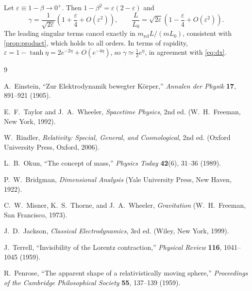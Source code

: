 \documentclass[11pt,a4paper]{article}
\theoremstyle{definition}
\theoremstyle{remark}
\newcommand{\mrel}{m_{\mathrm{rel}}}
\begin{document}
Let $\varepsilon\equiv1-\beta\to0^+$. Then $1-\beta^2=\varepsilon(2-\varepsilon)$ and
\begin{equation}
  \gamma=\frac{1}{\sqrt{2\varepsilon}}\left(1+\frac{\varepsilon}{4}
  +O(\varepsilon^{2})\right),
  \qquad
  \frac{L}{L_0}=\sqrt{2\varepsilon}\left(1-\frac{\varepsilon}{4}
  +O(\varepsilon^{2})\right).
\end{equation}
The leading singular terms cancel exactly in $\mrel L/(mL_0)$, consistent
with \cref{prop:product}, which holds to all orders. In terms of rapidity,
$\varepsilon=1-\tanh\eta=2e^{-2\eta}+O(e^{-4\eta})$, so
$\gamma\simeq\tfrac12e^{\eta}$, in agreement with \cref{eq:dx}.

\begin{thebibliography}{9}

A.~Einstein,
``Zur Elektrodynamik bewegter K\"orper,''
\emph{Annalen der Physik} \textbf{17}, 891--921 (1905).

E.~F.~Taylor and J.~A.~Wheeler,
\emph{Spacetime Physics}, 2nd ed. (W.~H.~Freeman, New York, 1992).

W.~Rindler,
\emph{Relativity: Special, General, and Cosmological}, 2nd ed.
(Oxford University Press, Oxford, 2006).

L.~B.~Okun,
``The concept of mass,''
\emph{Physics Today} \textbf{42}(6), 31--36 (1989).

P.~W.~Bridgman,
\emph{Dimensional Analysis} (Yale University Press, New Haven, 1922).

C.~W.~Misner, K.~S.~Thorne, and J.~A.~Wheeler,
\emph{Gravitation} (W.~H.~Freeman, San Francisco, 1973).

J.~D.~Jackson,
\emph{Classical Electrodynamics}, 3rd ed. (Wiley, New York, 1999).

J.~Terrell,
``Invisibility of the Lorentz contraction,''
\emph{Physical Review} \textbf{116}, 1041--1045 (1959).

R.~Penrose,
``The apparent shape of a relativistically moving sphere,''
\emph{Proceedings of the Cambridge Philosophical Society} \textbf{55},
137--139 (1959).

\end{thebibliography}
\end{document}

